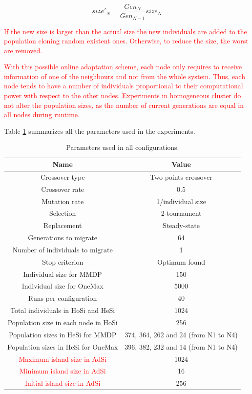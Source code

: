 \documentclass[final,1p,times]{elsarticle}
\begin{document}
\begin{equation}
size'_{N}=\dfrac{Gen_{N}}{Gen_{N-1}}size_{N}
\end{equation}

\textcolor{red}{If the new size is larger than the actual size the new individuals are added to the population cloning random existent ones. Otherwise, to reduce the size, the worst are removed.}

\textcolor{red}{With this possible online adaptation scheme, each node only requires to receive information of one of the neighbours and not from the whole system. Thus, each node tends to have a number of individuals proportional to their computational power with respect to the other nodes. Experiments in homogeneous cluster do not alter the population sizes, as the number of current generations are equal in all nodes during runtime.}

Table \ref{table:parameters} summarizes all the parameters used in the experiments.

\begin{table}
\centering
\caption{Parameters used in all configurations.}
\begin{tabular}{|c|c|} \hline
Name & Value\\ \hline

Crossover type & Two-points crossover \\ \hline
Crossover rate & 0.5\\ \hline
Mutation rate & 1/individual size\\ \hline
Selection & 2-tournament \\ \hline
Replacement & Steady-state\\ \hline
Generations to migrate & 64 \\ \hline
Number of individuals to migrate & 1 \\ \hline
Stop criterion & Optimum found \\ \hline
Individual size for MMDP & 150 \\ \hline
Individual size for OneMax & 5000 \\ \hline
Runs per configuration & 40 \\ \hline
\hline
Total individuals in HoSi and HeSi & 1024\\ \hline \hline
Population size in each node in HoSi & 256  \\ \hline
Population sizes in HeSi for MMDP & 374, 364, 262 and 24 (from N1 to N4)\\ \hline
Population sizes in HeSi for OneMax & 396,  382, 232 and 14 (from N1 to N4)\\ \hline
\hline
\textcolor{red}{Maximum island size in AdSi} & 1024 \\ \hline
\textcolor{red}{Minimum island size in AdSi} & 16 \\ \hline
\textcolor{red}{Initial island size in AdSi} & 256 \\ \hline 
\end{tabular}
\label{table:parameters}
\end{table}
\end{document}
